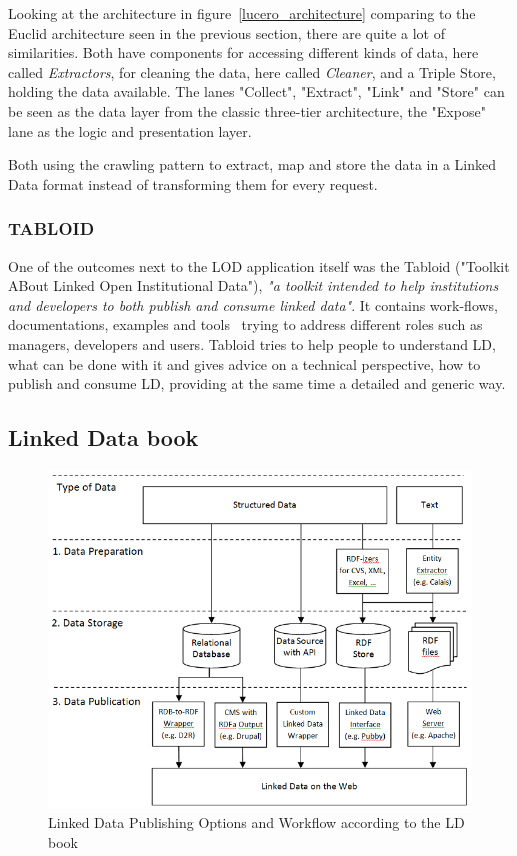 Looking at the architecture in figure~\ref{lucero_architecture} comparing to the 
Euclid architecture seen in the previous section, there are quite a lot of 
similarities. Both have components for accessing different kinds of data, here 
called \emph{Extractors}, for cleaning the data, here called \emph{Cleaner}, and a 
Triple Store, holding the data available. The lanes "Collect", "Extract", "Link" 
and "Store" can be seen as the data layer from the classic three-tier 
architecture, the "Expose" lane as the logic and presentation layer. 

Both using the crawling pattern to extract, map and store the data in a Linked 
Data format instead of transforming them for every request.

\subsubsection{TABLOID}
One of the outcomes next to the LOD application itself was the Tabloid ("Toolkit 
ABout Linked Open Institutional Data"), \emph{"a toolkit intended to help 
institutions and developers to both publish and consume linked data"}. It contains 
work-flows, documentations, examples and tools~\cite{lucero:tabloid} trying to 
address different roles such as managers, developers and users. Tabloid tries to 
help people to understand LD, what can be done with it and gives advice on a 
technical perspective, how to publish and consume LD, providing at the same time a 
detailed and generic way.

\subsection{Linked Data book}

\begin{figure}[htbp]
	\centering
\includegraphics[width=\textwidth]{img/ld_architecture.png}
	\caption{Linked Data Publishing Options and Workflow according to the LD book}
	\label{ld_architecture}
\end{figure}

